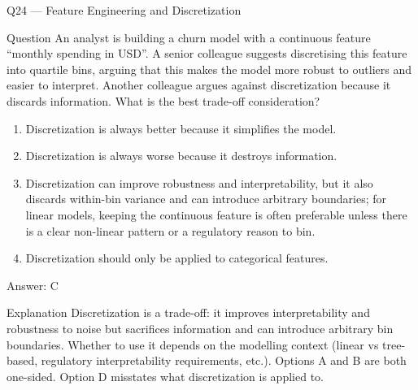 \documentclass[aspectratio=169,8pt]{beamer}
\begin{document}
	\begin{frame}{Q24 --- Feature Engineering and Discretization}
		\begin{block}{Question}
			An analyst is building a churn model with a continuous feature ``monthly spending in USD''. A senior colleague suggests discretising this feature into quartile bins, arguing that this makes the model more robust to outliers and easier to interpret. Another colleague argues against discretization because it discards information. What is the best trade-off consideration?
		\end{block}
		\begin{enumerate}
			\item Discretization is always better because it simplifies the model.
			\item Discretization is always worse because it destroys information.
			\item Discretization can improve robustness and interpretability, but it also discards within-bin variance and can introduce arbitrary boundaries; for linear models, keeping the continuous feature is often preferable unless there is a clear non-linear pattern or a regulatory reason to bin.
			\item Discretization should only be applied to categorical features.
		\end{enumerate}
		\begin{exampleblock}{Answer: C}\end{exampleblock}
		\begin{block}{Explanation}
			Discretization is a trade-off: it improves interpretability and robustness to noise but sacrifices information and can introduce arbitrary bin boundaries. Whether to use it depends on the modelling context (linear vs tree-based, regulatory interpretability requirements, etc.). Options A and B are both one-sided. Option D misstates what discretization is applied to.
		\end{block}
	\end{frame}
\end{document}

